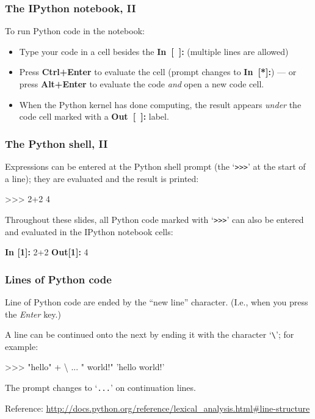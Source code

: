 \documentclass[english,serif,mathserif,xcolor=pdftex,dvipsnames,table]{beamer}
\begin{document}
\begin{frame}
  \frametitle{The IPython notebook, II}

  To run Python code in the notebook:
  \begin{itemize}
  \item Type your code in a cell besides the {\ttfamily\bfseries\color{blue}
      In~[~]:} (multiple lines are allowed)
  \item Press \textbf{Ctrl+Enter} to evaluate the cell (prompt changes to
    {\ttfamily\bfseries\color{blue} In~[*]:}) --- or press \textbf{Alt+Enter} to
    evaluate the code \emph{and} open a new code cell.
  \item When the Python kernel has done computing, the result appears \emph{under} the
    code cell marked with a {\ttfamily\bfseries\color{red} Out~[~]:} label.
  \end{itemize}

\end{frame}


\begin{frame}
  \frametitle{The Python shell, II}
  Expressions can be entered at the Python shell prompt (the
  `\texttt{>>>}' at the start of a line); they are evaluated and the
  result is printed:
\begin{semiverbatim}
>>> 2+2
4
\end{semiverbatim}

  \+ Throughout these slides, all Python code marked with `\texttt{>>>}' can
  also be entered and evaluated in the IPython notebook cells:
\begin{semiverbatim}
{\color{blue}\bfseries In [1]:} 2+2
{\color{red}\bfseries Out[1]:} 4
\end{semiverbatim}
\end{frame}


\begin{frame}[fragile]
  \frametitle{Lines of Python code}
  Line of Python code are ended by the ``new line'' character. (I.e., when you
  press the \emph{Enter} key.)

  \+
  A line can be continued onto the next by ending it with the
  character `\texttt{\textbackslash}'; for example:
\begin{semiverbatim}
>>> "hello" + \textbackslash
... " world!"
'hello world!'
\end{semiverbatim}
  The prompt changes to `\texttt{...}' on continuation lines.

  \+\scriptsize
  Reference:
  \url{http://docs.python.org/reference/lexical_analysis.html#line-structure}
\end{frame}
\end{document}
